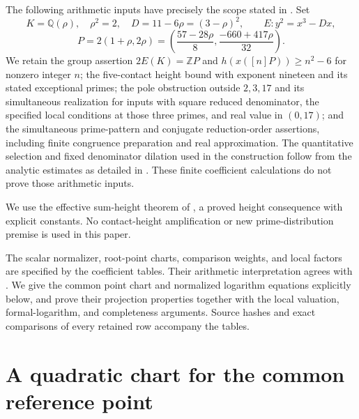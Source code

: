 \documentclass[11pt,a4paper]{article}
\theoremstyle{remark}\newtheorem{remark}[theorem]{Remark}
\newcommand{\Q}{\mathbb Q}\newcommand{\Z}{\mathbb Z}\newcommand{\HH}{\mathcal H}
\begin{document}
The following arithmetic inputs have precisely the scope stated in
\cite{Dependencies,Shared,Explicit}. Set
\[
 K=\Q(\rho),\quad \rho^2=2,\quad D=11-6\rho=(3-\rho)^2,
 \qquad E:y^2=x^3-Dx,
\]
\[
 P=2(1+\rho,2\rho)
  =\left(\frac{57-28\rho}{8},\frac{-660+417\rho}{32}\right).
\]
We retain the group assertion $2E(K)=\Z P$ and
$h(x([n]P))\ge n^2-6$ for nonzero integer $n$; the five-contact
height bound with exponent nineteen and its stated exceptional primes;
the pole obstruction outside $2,3,17$ and its simultaneous realization
for inputs with square reduced denominator, the specified local
conditions at those three primes, and real value in $(0,17)$; and the
simultaneous prime-pattern and conjugate reduction-order assertions,
including finite congruence preparation and real approximation.
The quantitative selection and fixed denominator dilation used in the
construction follow from the analytic estimates as detailed in
\cite{Selection}. These finite coefficient calculations do not prove
those arithmetic inputs.

We use the effective sum-height theorem of \cite{Sums}, a proved
height consequence with explicit constants. No contact-height amplification or new
prime-distribution premise is used in this paper.

The scalar normalizer, root-point charts, comparison weights, and
local factors are specified by the coefficient tables. Their arithmetic
interpretation agrees with \cite{Shared,Explicit}. We give the common
point chart and normalized logarithm equations explicitly below, and
prove their projection properties together with the local valuation,
formal-logarithm, and completeness arguments. Source hashes and exact
comparisons of every retained row accompany the tables.

\section{A quadratic chart for the common reference point}
\end{document}
